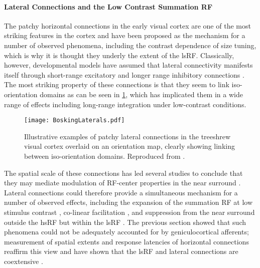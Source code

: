 \paragraph{Lateral Connections and the Low Contrast Summation RF}

The patchy horizontal connections in the early visual cortex are one
of the most striking features in the cortex and have been proposed as
the mechanism for a number of observed phenomena, including the
contrast dependence of size tuning, which is why it is thought they
underly the extent of the lsRF. Classically, however, developmental
models have assumed that lateral connectivity manifests itself through
short-range excitatory and longer range inhibitory connections
\citep{VonderMalsburg1973,Obermayer1990b}. The most striking property
of these connections is that they seem to link iso-orientation
domains as can be seen in \ref{BoskingLatExc}, which has implicated
them in a wide range of effects including long-range integration under
low-contrast conditions.

\begin{figure}
	\centering
        \texttt{[image: BoskingLaterals.pdf]}
	\caption[Patchy lateral connections overlaid on an orientation
      map. Reproduced from \cite{Bosking1997}.]{Illustrative
      examples of patchy lateral connections in the treeshrew visual
      cortex overlaid on an orientation map, clearly showing linking
      between iso-orientation domains. Reproduced from
      \cite{Bosking1997}.}
	\label{BoskingLatExc}
\end{figure}

The spatial scale of these connections has led several studies to
conclude that they may mediate modulation of RF-center properties in
the near surround \citep{Angelucci2002}. Lateral connections could
therefore provide a simultaneous mechanism for a number of observed
effects, including the expansion of the summation RF at low stimulus
contrast \citep{Sceniak1999}, co-linear facilitation
\citep{Mizobe2001}, and suppression from the near surround
outside the hsRF but within the lsRF
\citep{Sceniak2001,Levitt2002}. The previous section showed that such
phenomena could not be adequately accounted for by geniculocortical
afferents; measurement of spatial extents and response latencies of
horizontal connections reaffirm this view and have shown that the lsRF
and lateral connections are coextensive \citep{Angelucci2002}.

